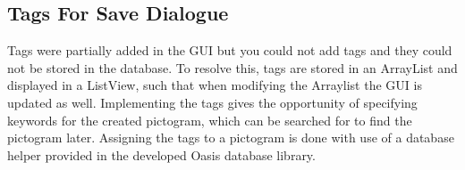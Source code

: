 \subsection{Tags For Save Dialogue}
Tags were partially added in the GUI but you could not add tags and they could not be stored in the database.
To resolve this, tags are stored in an ArrayList and displayed in a ListView, such that when modifying the Arraylist the GUI is updated as well.
Implementing the tags gives the opportunity of specifying keywords for the created pictogram, which can be searched for to find the pictogram later.
Assigning the tags to a pictogram is done with use of a database helper provided in the developed Oasis database library.